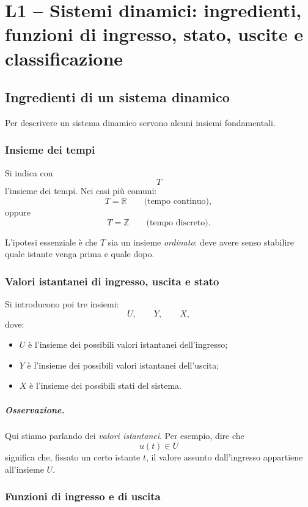 \chapter{L1 -- Sistemi dinamici: ingredienti, funzioni di ingresso, stato, uscite e classificazione}

\section{Ingredienti di un sistema dinamico}

Per descrivere un sistema dinamico servono alcuni insiemi fondamentali.

\subsection{Insieme dei tempi}

Si indica con
\[
T
\]
l'insieme dei tempi. Nei casi più comuni:
\[
T=\mathbb{R} \qquad \text{(tempo continuo)},
\]
oppure
\[
T=\mathbb{Z} \qquad \text{(tempo discreto)}.
\]

L'ipotesi essenziale è che $T$ sia un insieme \emph{ordinato}: deve avere senso stabilire quale istante venga prima e quale dopo.

\subsection{Valori istantanei di ingresso, uscita e stato}

Si introducono poi tre insiemi:
\[
U, \qquad Y, \qquad X,
\]
dove:
\begin{itemize}
    \item $U$ è l'insieme dei possibili valori istantanei dell'ingresso;
    \item $Y$ è l'insieme dei possibili valori istantanei dell'uscita;
    \item $X$ è l'insieme dei possibili stati del sistema.
\end{itemize}

\paragraph{Osservazione.}
Qui stiamo parlando dei \emph{valori istantanei}.  
Per esempio, dire che
\[
u(t)\in U
\]
significa che, fissato un certo istante $t$, il valore assunto dall'ingresso appartiene all'insieme $U$.

\subsection{Funzioni di ingresso e di uscita}

